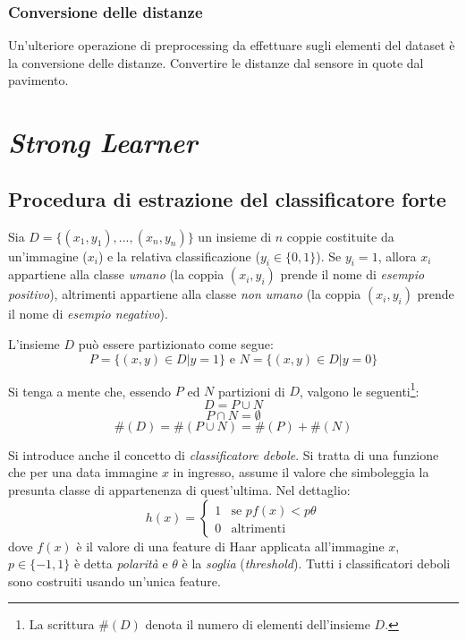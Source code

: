             \subsubsection{Conversione delle distanze}
                Un'ulteriore operazione di preprocessing da effettuare sugli elementi del dataset è la conversione delle distanze.
                Convertire le distanze dal sensore in quote dal pavimento.

    \section{\emph{Strong Learner}}
    \label{sec:strong_learner}
        \subsection{Procedura di estrazione del classificatore forte}
            Sia $D = \{(x_1, y_1), ..., (x_n, y_n)\}$ un insieme di $n$ coppie costituite da un'immagine ($x_i$) e la relativa classificazione ($y_i \in \{ 0, 1 \}$). Se $y_i = 1$, allora $x_i$ appartiene alla classe \emph{umano} (la coppia $(x_i, y_i)$ prende il nome di \emph{esempio positivo}), altrimenti appartiene alla classe \emph{non umano} (la coppia $(x_i, y_i)$ prende il nome di \emph{esempio negativo}).

            L'insieme $D$ può essere partizionato come segue:
            $$P = \{(x, y) \in D | y = 1\} \text{ e } N = \{(x,y) \in D | y = 0\}$$

            Si tenga a mente che, essendo $P$ ed $N$ partizioni di $D$, valgono le seguenti\footnote{La scrittura $\#(D)$ denota il numero di elementi dell'insieme $D$.}:
            \begin{equation}
                D = P \cup N
            \end{equation}
            \begin{equation}
                P \cap N = \emptyset
            \end{equation}
            \begin{equation}
                \#(D) = \#(P \cup N) = \#(P) + \#(N)
            \end{equation}

            Si introduce anche il concetto di \emph{classificatore debole}. Si tratta di una funzione che per una data immagine $x$ in ingresso, assume il valore che simboleggia la presunta classe di appartenenza di quest'ultima.
            Nel dettaglio:
            \begin{equation}
                h(x) = \begin{cases}
                1 & \text{se $pf(x) < p\theta$}\\
                0 & \text{altrimenti}
            \end{cases}
            \end{equation}
            dove $f(x)$ è il valore di una feature di Haar applicata all'immagine $x$, $p \in \{-1,1\}$ è detta \emph{polarità} e $\theta$ è la \emph{soglia} (\emph{threshold}). Tutti i classificatori deboli sono costruiti usando un'unica feature.

